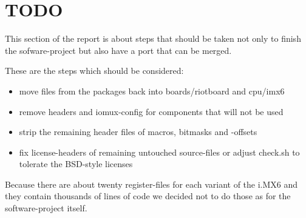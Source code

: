 \section{TODO}

This section of the report is about steps that should be taken not only to finish the sofware-project but also have a port that can be merged.

These are the steps which should be considered:
\begin{itemize}
\item move files from the packages back into boards/riotboard and cpu/imx6
\item remove headers and iomux-config for components that will not be used
\item strip the remaining header files of macros, bitmasks and -offsets
\item fix license-headers of remaining untouched source-files or adjust check.sh to tolerate the BSD-style licenses
\end{itemize}

Because there are about twenty register-files for each variant of the i.MX6 and they contain thousands of lines of code we decided not to do those as for the software-project itself.
